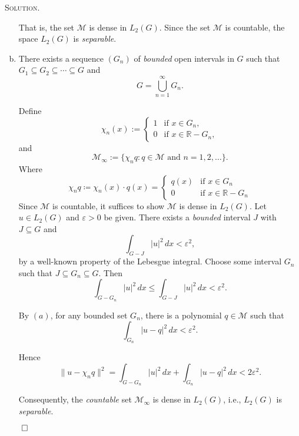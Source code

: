 \documentclass[12pt, a4paper, oneside]{ctexart}
\newenvironment{solution}{%
	\par\noindent\textsc{Solution. }\ignorespaces
}{%
	\hfill$\qed$\par
}
\begin{document}
\begin{solution}
\begin{enumerate}[(a)]
			That is, the set \( \mathcal{M} \) is dense in \( L_2(G) \). Since the set \( \mathcal{M} \) is countable, the space \( L_2(G) \) is \textit{separable}.
			\item  There exists a sequence \( (G_n) \) of \textit{bounded} open intervals in \( G \) such that \( G_1 \subseteq G_2 \subseteq \cdots \subseteq G \) and
			\[
			G = \bigcup_{n=1}^{\infty} G_n.
			\]
			
			Define
			\[
			\chi_n(x) := \begin{cases} 
				1 & \text{if } x \in G_n, \\
				0 & \text{if } x \in \mathbb{R} - G_n,
			\end{cases}
			\]
			and
			\[
			\mathcal{M}_\infty := \{\chi_n q : q \in \mathcal{M} \text{ and } n = 1, 2, \dots \}.
			\]
			Where \[ \chi_nq\coloneqq \chi_{n}(x)\cdot q(x)=\begin{cases}
				q(x) & \text{if } x\in G_{n}\\
				0 & \text{if } x\in \mathbb{R} - G_{n}
 			\end{cases}  \]
			Since $\mathcal{M}$ is countable, it suffices to show $\mathcal{M}$ is dense in $L_{2}(G)$. Let \( u \in L_2(G) \) and \( \varepsilon > 0 \) be given. There exists a \textit{bounded} interval \( J \) with \( J \subseteq G \) and
			\[
			\int_{G - J} |u|^2 \, dx < \varepsilon^2,
			\]
			by a well-known property of the Lebesgue integral. Choose some interval \( G_n \) such that \( J \subseteq G_n \subseteq G \). Then
			\[
			\int_{G - G_n} |u|^2 \, dx \leq \int_{G - J} |u|^2 \, dx < \varepsilon^2.
			\]
			
			By $(a)$, for any bounded set $G_{n}$, there is a polynomial \( q \in \mathcal{M} \) such that
			\[
			\int_{G_n} |u - q|^2 \, dx < \varepsilon^2.
			\]
			
			Hence
			\[
			\|u - \chi_n q\|^2 = \int_{G - G_n} |u|^2 \, dx + \int_{G_n} |u - q|^2 \, dx < 2\varepsilon^2.
			\]
			
			Consequently, the \textit{countable} set \( \mathcal{M}_\infty \) is dense in \( L_2(G) \), i.e., \( L_2(G) \) is \textit{separable}.
			
		\end{enumerate}
	\end{solution}
\end{document}
